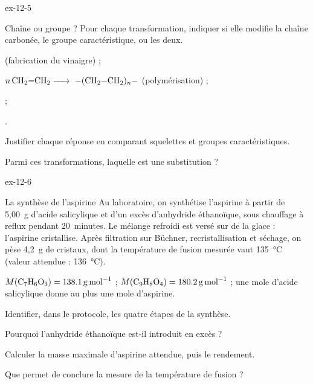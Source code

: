 \begin{blocLivre}{ex-12-5}
\begin{exercice}[1]{Chaîne ou groupe ?}
Pour chaque transformation, indiquer si elle modifie la chaîne carbonée, le groupe caractéristique, ou les deux.
\begin{questions}[label=\otLabel{\alph*.},leftmargin=1.9em,itemsep=0pt,parsep=0.15em]
\item {} (fabrication du vinaigre) ;
\item $n\,\ce{CH2=CH2 ->}\ \ce{-(CH2-CH2)_{$n$}-}$ (polymérisation) ;
\item {} ;
\item {}.
\end{questions}
\begin{questions}
\item Justifier chaque réponse en comparant squelettes et groupes caractéristiques.
\item Parmi ces transformations, laquelle est une substitution ?
\end{questions}
\end{exercice}
\end{blocLivre}
\begin{blocLivre}{ex-12-6}
\begin{exercice}[2]{La synthèse de l'aspirine}
Au laboratoire, on synthétise l'aspirine  à partir de 5,00~g d'acide salicylique  et d'un excès
d'anhydride éthanoïque, sous chauffage à reflux pendant 20~minutes. Le mélange refroidi est versé sur de la glace :
l'aspirine cristallise. Après filtration sur Büchner, recristallisation et séchage, on pèse 4,2~g de cristaux, dont la
température de fusion mesurée vaut 135~°C (valeur attendue : 136~°C).
\begin{donnees}
$M(\ce{C7H6O3})=\qty{138,1}{g.mol^{-1}}$ ; $M(\ce{C9H8O4})=\qty{180,2}{g.mol^{-1}}$ ; une mole d'acide salicylique
donne au plus une mole d'aspirine.
\end{donnees}
\begin{questions}
\item Identifier, dans le protocole, les quatre étapes de la synthèse.
\item Pourquoi l'anhydride éthanoïque est-il introduit en excès ?
\item Calculer la masse maximale d'aspirine attendue, puis le rendement.
\item Que permet de conclure la mesure de la température de fusion ?
\end{questions}
\end{exercice}
\end{blocLivre}
